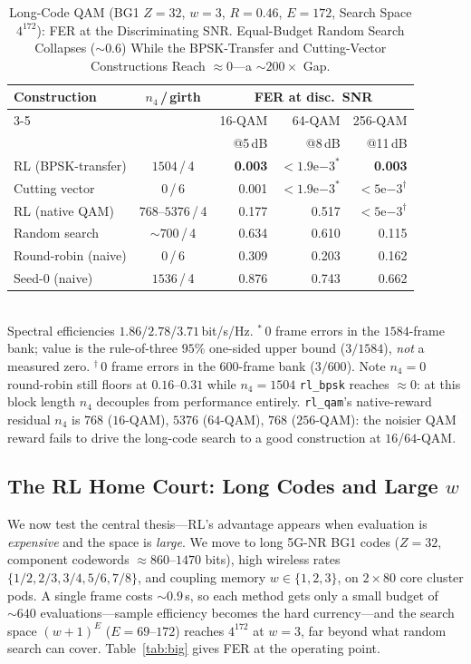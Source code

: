 \documentclass[journal]{IEEEtran}
\begin{document}
\begin{table}[t]
\centering
\caption{Long-Code QAM (BG1 $Z{=}32$, $w{=}3$, $R{=}0.46$, $E{=}172$,
Search Space $4^{172}$): FER at the Discriminating SNR. Equal-Budget Random
Search Collapses ($\sim\!0.6$) While the BPSK-Transfer and Cutting-Vector
Constructions Reach $\approx\!0$---a $\sim\!200\times$ Gap.}
\label{tab:qamlong}
\renewcommand{\arraystretch}{1.2}
\setlength{\tabcolsep}{4pt}
\footnotesize
\begin{tabular}{@{}lcrrr@{}}
\toprule
Construction & $n_4$\,/\,girth & \multicolumn{3}{c}{FER at disc.\ SNR}\\
\cmidrule(l){3-5}
 & & 16-QAM & 64-QAM & 256-QAM\\
 & & @5\,dB & @8\,dB & @11\,dB\\
\midrule
RL (BPSK-transfer)  & $1504$\,/\,4 & \textbf{0.003} & $\mathbf{<}1.9\mathrm{e}{-3}^{\ast}$ & \textbf{0.003}\\
Cutting vector~\cite{mitchell2015scldpc} & $0$\,/\,6 & 0.001 & ${<}1.9\mathrm{e}{-3}^{\ast}$ & ${<}5\mathrm{e}{-3}^{\dagger}$\\
RL (native QAM)     & $768$--$5376$\,/\,4 & 0.177 & 0.517 & ${<}5\mathrm{e}{-3}^{\dagger}$\\
Random search       & $\sim\!700$\,/\,4 & 0.634 & 0.610 & 0.115\\
\midrule
Round-robin (naive) & $0$\,/\,6 & 0.309 & 0.203 & 0.162\\
Seed-0 (naive)      & $1536$\,/\,4 & 0.876 & 0.743 & 0.662\\
\bottomrule
\end{tabular}
\\[3pt]
{\footnotesize Spectral efficiencies $1.86$/$2.78$/$3.71$\,bit/s/Hz. $^{\ast}$\,$0$
frame errors in the $1584$-frame bank; value is the rule-of-three $95\%$ one-sided
upper bound ($3/1584$), \emph{not} a measured zero. $^{\dagger}$\,$0$ frame errors
in the $600$-frame bank ($3/600$). Note $n_4{=}0$ round-robin still floors at
$0.16$--$0.31$ while $n_4{=}1504$ \texttt{rl\_bpsk} reaches $\approx\!0$: at this
block length $n_4$ decouples from performance entirely. \texttt{rl\_qam}'s
native-reward residual $n_4$ is $768$ ($16$-QAM), $5376$ ($64$-QAM), $768$
($256$-QAM): the noisier QAM reward fails to drive the long-code search to a good
construction at $16$/$64$-QAM.}
\end{table}

\subsection{The RL Home Court: Long Codes and Large $w$}
\label{sec:results-bigw}
We now test the central thesis---RL's advantage appears when evaluation is
\emph{expensive} and the space is \emph{large}. We move to long 5G-NR BG1 codes
($Z{=}32$, component codewords $\approx\!860$--$1470$ bits), high wireless rates
$\{1/2,2/3,3/4,5/6,7/8\}$, and coupling memory $w\in\{1,2,3\}$, on $2\times80$
core cluster pods. A single frame costs $\sim\!0.9$\,s, so each method gets only
a small budget of $\sim\!640$ evaluations---sample efficiency becomes the hard
currency---and the search space $(w{+}1)^E$ ($E{=}69$--$172$) reaches $4^{172}$
at $w{=}3$, far beyond what random search can cover.
Table~\ref{tab:big} gives FER at the operating point.
\end{document}
